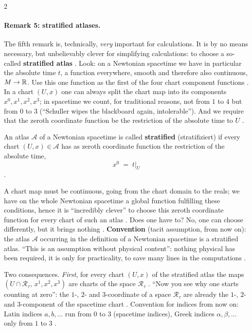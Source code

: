 \begin{paracol}{2}
\paragraph{Remark 5: stratified atlases.} The fifth remark is, technically, \emph{very} important for calculations. It is by no means necessary, but unbelievably clever for simplifying calculations: to choose
a so-called \textbf{stratified atlas} . Look: on a Newtonian spacetime we have in particular the absolute time $t$, a function everywhere, smooth and therefore also continuous, $M\to\mathbb{R}$. Use this one function
as the first of the four chart component functions . In a chart $(U,x)$ one can always split the chart map into its components $x^0,x^1,x^2,x^3$; in spacetime we count, for
traditional reasons, not from $1$ to $4$ but from $0$ to $3$ (``Schuller wipes the blackboard again, intolerable''). And we require that the zeroth coordinate function be the restriction of the absolute time to $U$
.
\begin{definition}\label{def:nk-stratified}
An atlas $\mathcal A$ of a Newtonian spacetime is called \textbf{stratified} (stratifiziert) if every chart $(U,x)\in\mathcal A$ has as zeroth coordinate function the restriction of the absolute time,
\[
  x^0\;=\;t|_U
\]
.
\end{definition}
A chart map must be continuous, going from the chart domain to the reals; we have on the whole Newtonian spacetime a global function fulfilling these conditions, hence it is ``incredibly clever'' to choose this zeroth coordinate function for every
chart of such an atlas . Does one have to? No, one can choose differently, but it brings nothing . \textbf{Convention} (tacit assumption, from now on): the atlas $\mathcal A$ occurring in the definition of a Newtonian spacetime
is a stratified atlas. ``This is an assumption without physical content'': nothing physical has been required, it is only for practicality, to save many lines in the computations
.

Two consequences. \emph{First}, for every chart $(U,x)$ of the stratified atlas the maps $(U\cap\mathcal R_\tau,\,x^1,x^2,x^3)$ are charts of the space $\mathcal R_\tau$ . ``Now you see why one starts counting at zero'': the $1$-,
$2$- and $3$-coordinate of a space $\mathcal R_\tau$ are already the $1$-, $2$- and $3$-component of the spacetime chart . Convention for indices from now on: Latin indices $a,b,\dots$ run from $0$ to $3$ (spacetime indices), Greek indices $\alpha,\beta,\dots$ only from $1$ to $3$
.


\end{paracol}
